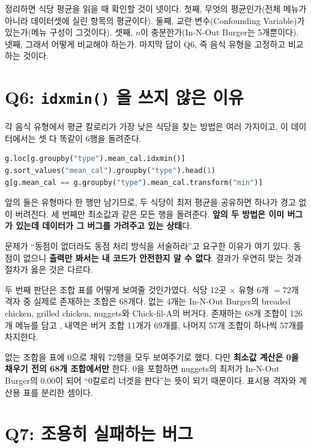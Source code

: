 정리하면 식당 평균을 읽을 때 확인할 것이 넷이다. 첫째, 무엇의 평균인가(전체 메뉴가
아니라 데이터셋에 실린 항목의 평균이다). 둘째, 교란 변수(Confounding Variable)가
있는가(메뉴 구성이 그것이다). 셋째, $n$이 충분한가(In-N-Out Burger는 5개뿐이다). 넷째,
그래서 어떻게 비교해야 하는가. 마지막 답이 Q6, 즉 음식 유형을 고정하고 비교하는 것이다.

\section{Q6: \texttt{idxmin()} 을 쓰지 않은 이유}
\label{sec:hw1-q6}

각 음식 유형에서 평균 칼로리가 가장 낮은 식당을 찾는 방법은 여러 가지이고, 이 데이터에서는
셋 다 똑같이 6행을 돌려준다.

\begin{lstlisting}[language=Python]
g.loc[g.groupby("type").mean_cal.idxmin()]
g.sort_values("mean_cal").groupby("type").head(1)
g[g.mean_cal == g.groupby("type").mean_cal.transform("min")]
\end{lstlisting}

앞의 둘은 유형마다 한 행만 남기므로, 두 식당이 최저 평균을 공유하면 하나가 경고 없이
버려진다. 세 번째만 최소값과 같은 모든 행을 돌려준다. \textbf{앞의 두 방법은 이미 버그가
있는데 데이터가 그 버그를 가려주고 있는 상태}다.

\begin{keyidea}
문제가 ``동점이 없더라도 동점 처리 방식을 서술하라''고 요구한 이유가 여기 있다.
동점이 없으니 \textbf{출력만 봐서는 내 코드가 안전한지 알 수 없다}. 결과가 우연히
맞는 것과 절차가 옳은 것은 다르다.
\end{keyidea}

두 번째 판단은 조합 표를 어떻게 보여줄 것인가였다. 식당 12곳 $\times$ 유형 6개
$= 72$개 격자 중 실제로 존재하는 조합은 68개다. 없는 4개는 In-N-Out Burger의 breaded
chicken, grilled chicken, nuggets와 Chick-fil-A의 버거다. 존재하는 68개 조합이 126개
메뉴를 담고 \contains, 내역은 버거 조합 11개가 69개를, 나머지 57개 조합이 하나씩 57개를
차지한다.

없는 조합을 표에 0으로 채워 72행을 모두 보여주기로 했다. 다만 \textbf{최소값 계산은
0을 채우기 전의 68개 조합에서만} 한다. 0을 포함하면 nuggets의 최저가 In-N-Out Burger의
0.00이 되어 ``0칼로리 너겟을 판다''는 뜻이 되기 때문이다. 표시용 격자와 계산용 표를
분리한 셈이다.

\section{Q7: 조용히 실패하는 버그}
\label{sec:hw1-q7}

